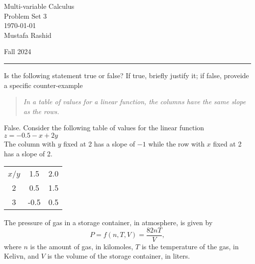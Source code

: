 \documentclass[12pt,letterpaper, onecolumn]{exam}
\begin{document}
	
	\begingroup  
	\centering
	\LARGE Multi-variable Calculus\\
	\LARGE Problem Set 3\\[0.5em]
	\large \today\\[0.5em]
	\large Mustafa Rashid\par
	\large Fall 2024\par
	\endgroup
	\rule{\textwidth}{0.4pt}
	\pointsdroppedatright
	\printanswers
	\renewcommand{\solutiontitle}{\noindent\textbf{Ans:}\enspace}  
	
	

	\begin{questions}
		
		\question Is the following statement true or false? If true, briefly justify it; if false, proveide a specific counter-example
		\begin{quote}
			\textit{In a table of values for a linear function, the columns have the same slope as the rows.}
		\end{quote}	
		
		\begin{solution}
			False. Consider the following table of values for the linear function $z=-0.5-x+2y$\\
			The column with $y$ fixed at 2 has a slope of $-1$ while the row with $x$ fixed at 2 has a slope of 2.\\
			\begin{tabular}{ c c c}
				$x$/$y$ & 1.5 & 2.0\\
				2 & 0.5 & 1.5\\
				3 & -0.5 & 0.5\\
			\end{tabular}

		\end{solution}
		
		\question The pressure of gas in  a storage container, in atmosphere, is given by
		$$P=f(n,T,V)=\frac{82nT}{V},$$
		where $n$ is the amount of gas, in kilomoles, $T$ is the temperature of the gas, in Kelivn, and $V$ is the volume of the storage container, in liters.
		\pagebreak
		\begin{solution}
			\begin{parts}

\end{parts}
\end{solution}
\end{questions}
\end{document}
